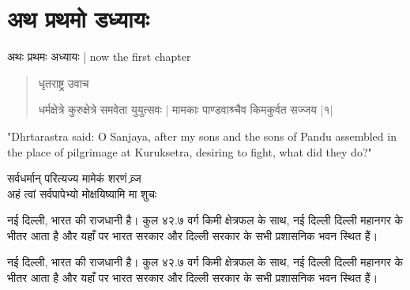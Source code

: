 \chapter{अथ प्रथमो डध्यायः}

\begin{center}
	अथः प्रथमः अध्यायः | now the first chapter
\end{center}

\begin{verse}
धृतराष्ट्र उवाच

धर्मक्षेत्रे कुरुक्षेत्रे समवेता युयुत्सवः |
मामकाः पाण्डवाश्र्चैव किमकुर्वत सज्जय |१|
\end{verse}
"Dhrtarastra said: O Sanjaya, after my sons and the sons of Pandu assembled in the place of pilgrimage at Kuruksetra, desiring to fight, what did they do?"

\begin{center}

सर्वधर्मान् परित्यज्य मामेकं शरणं व्र्ज\\
अहं त्वां सर्वपापेभ्यो मोक्षयिष्यामि मा शुचः

\end{center}

नई दिल्ली, भारत की राजधानी है। कुल ४२.७ वर्ग किमी क्षेत्रफल के साथ, नई दिल्ली दिल्ली महानगर
के भीतर आता है और यहाँ पर भारत सरकार और दिल्ली सरकार के सभी प्रशासनिक भवन स्थित हैं।

नई दिल्ली, भारत की राजधानी है। कुल ४२.७ वर्ग किमी क्षेत्रफल के साथ, नई दिल्ली दिल्ली महानगर
के भीतर आता है और यहाँ पर भारत सरकार और दिल्ली सरकार के सभी प्रशासनिक भवन स्थित हैं।